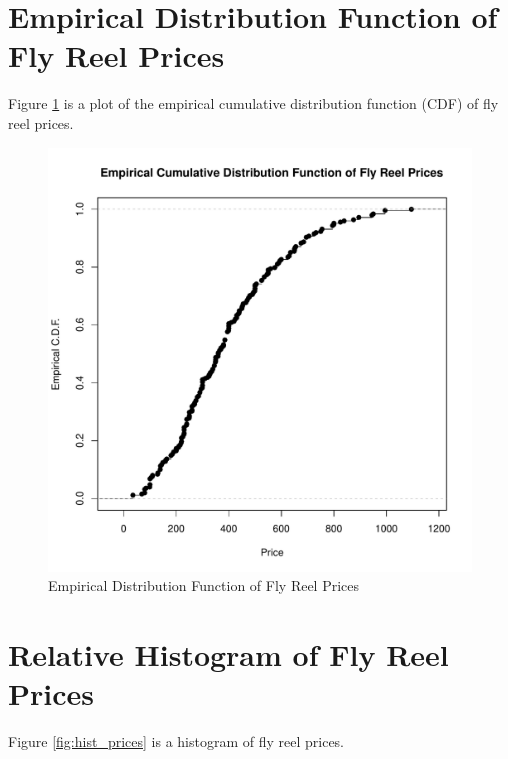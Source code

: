 \documentclass[11pt]{book}
\begin{document}
\section*{Empirical Distribution Function of Fly Reel Prices}

Figure \ref{fig:ecdf_prices} is 
a plot of the empirical cumulative distribution function (CDF) of fly reel prices. 


\begin{figure}[h!]
  \centering
  \includegraphics[scale = 0.5, keepaspectratio=true]{../Figures/ecdf_prices}
  \caption{Empirical Distribution Function of Fly Reel Prices} \label{fig:ecdf_prices}
\end{figure}


\section*{Relative Histogram of Fly Reel Prices}

Figure \ref{fig:hist_prices} is 
a histogram of fly reel prices. 
\end{document}
